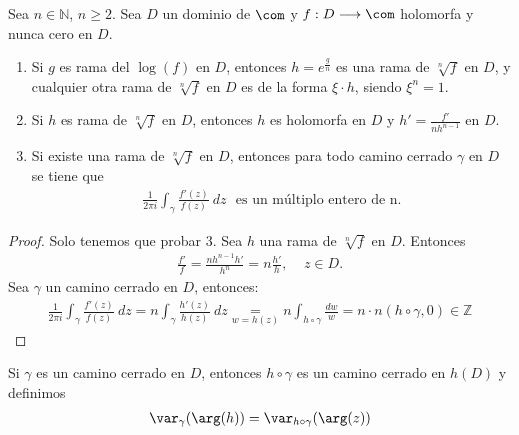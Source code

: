 \begin{teo}[Recopilatorio]
Sea $n \in \mathbb{N}$, $n \ge 2$. Sea $D$ un dominio de $\com$ y $f:D \longrightarrow \com$ holomorfa y nunca cero en $D$.
\begin{enumerate}
    \item Si $g$ es rama del $\log(f)$ en $D$, entonces $h = e^{\frac{g}{n}}$ es una rama de $\sqrt[n]{f}$ en $D$, y cualquier otra rama de $\sqrt[n]{f}$ en $D$ es de la forma $\xi \cdot h$, siendo $\xi^n = 1$.
    \item Si $h$ es rama de $\sqrt[n]{f}$ en $D$, entonces $h$ es holomorfa en $D$ y $h' = \frac{f'}{nh^{n-1}}$ en $D$.
    \item Si existe una rama de $\sqrt[n]{f}$ en $D$, entonces para todo camino cerrado $\gamma$ en $D$ se tiene que 
    \begin{align*}
        \frac{1}{2\pi i} \int_{\gamma} \frac{f'(z)}{f(z)} \ dz \ \ \ \text{es un múltiplo entero de n}. 
    \end{align*}
\end{enumerate}
\end{teo}

\begin{proof}
Solo tenemos que probar $3$. Sea $h$ una rama de $\sqrt[n]{f}$ en $D$. Entonces
\begin{align*}
    \frac{f'}{f} = \frac{nh^{n-1}h'}{h^{n}} = n\frac{h'}{h}, \ \ \ \ \ z \in D.
\end{align*}
Sea $\gamma$ un camino cerrado en $D$, entonces:
\begin{align*}
    \frac{1}{2\pi i} \int_{\gamma} \frac{f'(z)}{f(z)} \ dz = n\int_{\gamma} \frac{h'(z)}{h(z)} \ dz \underset{w = h(z)}{=} n \int_{h \circ \gamma} \frac{dw}{w} = n \cdot n(h \circ \gamma, 0) \in \mathbb{Z}
\end{align*}
\end{proof}

\begin{obs}
Si $\gamma$ es un camino cerrado en $D$, entonces $h \circ \gamma$ es un camino cerrado en $h(D)$ y definimos
\begin{align*}
    \var_{\gamma}(\arg(h)) = \var_{h \circ \gamma}(\arg(z))
\end{align*}
\end{obs}

